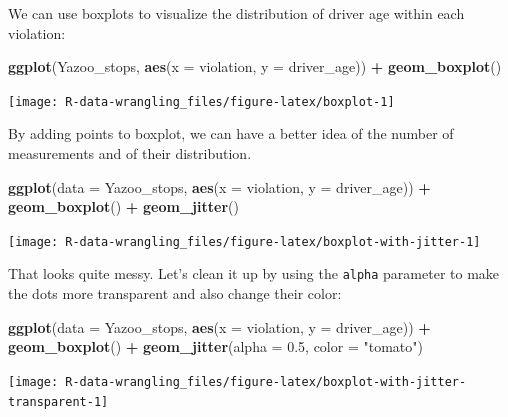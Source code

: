 \documentclass[]{book}
\newenvironment{Shaded}{\begin{snugshade}}{\end{snugshade}}
\newcommand{\DataTypeTok}[1]{\textcolor[rgb]{0.13,0.29,0.53}{#1}}
\newcommand{\FloatTok}[1]{\textcolor[rgb]{0.00,0.00,0.81}{#1}}
\newcommand{\KeywordTok}[1]{\textcolor[rgb]{0.13,0.29,0.53}{\textbf{#1}}}
\newcommand{\NormalTok}[1]{#1}
\newcommand{\OperatorTok}[1]{\textcolor[rgb]{0.81,0.36,0.00}{\textbf{#1}}}
\newcommand{\StringTok}[1]{\textcolor[rgb]{0.31,0.60,0.02}{#1}}
\begin{document}
We can use boxplots to visualize the distribution of driver age within each violation:

\begin{Shaded}
\begin{Highlighting}[]
\KeywordTok{ggplot}\NormalTok{(Yazoo_stops, }\KeywordTok{aes}\NormalTok{(}\DataTypeTok{x =}\NormalTok{ violation, }\DataTypeTok{y =}\NormalTok{ driver_age)) }\OperatorTok{+}
\StringTok{    }\KeywordTok{geom_boxplot}\NormalTok{()}
\end{Highlighting}
\end{Shaded}

\texttt{[image: R-data-wrangling\_files/figure-latex/boxplot-1]}

By adding points to boxplot, we can have a better idea of the number of
measurements and of their distribution.

\begin{Shaded}
\begin{Highlighting}[]
\KeywordTok{ggplot}\NormalTok{(}\DataTypeTok{data =}\NormalTok{ Yazoo_stops, }\KeywordTok{aes}\NormalTok{(}\DataTypeTok{x =}\NormalTok{ violation, }\DataTypeTok{y =}\NormalTok{ driver_age)) }\OperatorTok{+}
\StringTok{    }\KeywordTok{geom_boxplot}\NormalTok{() }\OperatorTok{+}
\StringTok{    }\KeywordTok{geom_jitter}\NormalTok{()}
\end{Highlighting}
\end{Shaded}

\texttt{[image: R-data-wrangling\_files/figure-latex/boxplot-with-jitter-1]}

That looks quite messy. Let's clean it up by using the \texttt{alpha} parameter to make the dots more transparent and also change their color:

\begin{Shaded}
\begin{Highlighting}[]
\KeywordTok{ggplot}\NormalTok{(}\DataTypeTok{data =}\NormalTok{ Yazoo_stops, }\KeywordTok{aes}\NormalTok{(}\DataTypeTok{x =}\NormalTok{ violation, }\DataTypeTok{y =}\NormalTok{ driver_age)) }\OperatorTok{+}
\StringTok{    }\KeywordTok{geom_boxplot}\NormalTok{() }\OperatorTok{+}
\StringTok{    }\KeywordTok{geom_jitter}\NormalTok{(}\DataTypeTok{alpha =} \FloatTok{0.5}\NormalTok{, }\DataTypeTok{color =} \StringTok{"tomato"}\NormalTok{)}
\end{Highlighting}
\end{Shaded}

\texttt{[image: R-data-wrangling\_files/figure-latex/boxplot-with-jitter-transparent-1]}
\end{document}
